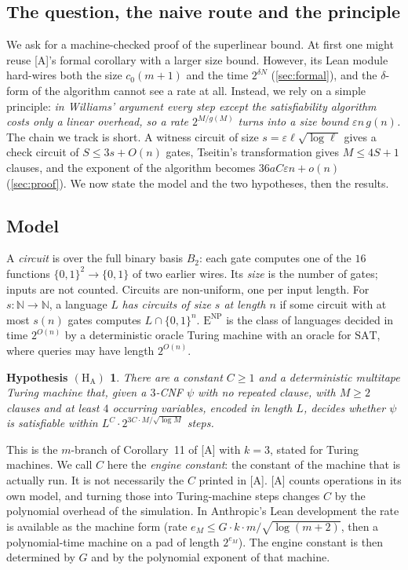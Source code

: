 \documentclass[10pt]{amsart}
\theoremstyle{plain}
\newtheorem*{hypA}{Hypothesis $(\mathrm{H}_{\mathrm{A}})$}
\theoremstyle{definition}
\theoremstyle{remark}
\numberwithin{equation}{section}
\newcommand{\ENP}{\mathrm{E}^{\mathrm{NP}}}
\newcommand{\A}{\textup{[A]}}
\begin{document}
\subsection{The question, the naive route and the principle}
We ask for a machine-checked proof of the superlinear bound. At first one might
reuse \A's formal corollary with a larger size bound. However, its Lean module hard-wires both the
size $c_0(m+1)$ and the time $2^{\delta N}$ (\cref{sec:formal}), and the $\delta$-form of the
algorithm cannot see a rate at all. Instead, we rely on a simple principle: \emph{in Williams'
argument every step except the satisfiability algorithm costs only a linear overhead, so a rate
$2^{M/g(M)}$ turns into a size bound $\varepsilon n\,g(n)$.} The chain we track is short. A witness
circuit of size $s=\varepsilon\ell\sqrt{\log\ell}$ gives a check circuit of
$S\le 3s+O(n)$ gates, Tseitin's transformation gives $M\le4S+1$ clauses, and the exponent of the
algorithm becomes $36aC\varepsilon n+o(n)$ (\cref{sec:proof}). We now state the model and the two hypotheses, then the results.

\subsection{Model}
A \emph{circuit} is over the full binary basis $B_2$: each gate computes one of the $16$
functions $\{0,1\}^2\to\{0,1\}$ of two earlier wires. Its \emph{size} is the number of gates;
inputs are not counted. Circuits are non-uniform, one per input length. For $s\colon\mathbb N\to\mathbb N$,
a language $L$ \emph{has circuits of size $s$ at length $n$} if some circuit with at most $s(n)$
gates computes $L\cap\{0,1\}^n$. $\ENP$ is the class of languages decided in time $2^{O(n)}$ by a
deterministic oracle Turing machine with an oracle for $\mathrm{SAT}$, where queries may have
length $2^{O(n)}$.

\begin{hypA}
There are a constant $C\ge1$ and a deterministic multitape Turing machine that, given a $3$-CNF
$\psi$ with no repeated clause, with $M\ge2$ clauses and at least $4$ occurring variables, encoded
in length $L$, decides whether $\psi$ is satisfiable within $L^{C}\cdot2^{3C\cdot M/\sqrt{\log M}}$
steps.
\end{hypA}

\noindent This is the $m$-branch of Corollary~11 of \A{} with $k=3$, stated for Turing machines. We
call $C$ here the \emph{engine constant}: the constant of the machine that is actually run. It is not
necessarily the $C$ printed in \A. \A{} counts operations in its own model, and turning those into
Turing-machine steps changes $C$ by the polynomial overhead of the simulation. In Anthropic's Lean
development the rate is available as the machine form  (rate
$e_M\le G\cdot k\cdot m/\sqrt{\log(m+2)}$, then a polynomial-time machine on a pad of length
$2^{e_M}$). The engine constant is then determined by $G$ and by the polynomial exponent of that
machine.
\end{document}
